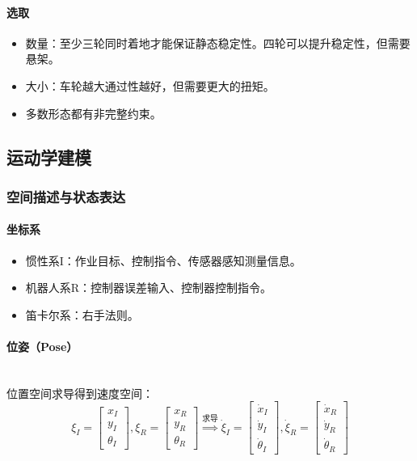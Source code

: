 \documentclass[
12pt, %
a4paper, 
oneside, %
headinclude,footinclude, %
]{scrartcl}
\begin{document}
\paragraph{选取}
\begin{itemize}
\item 数量：至少三轮同时着地才能保证静态稳定性。四轮可以提升稳定性，但需要悬架。
\item 大小：车轮越大通过性越好，但需要更大的扭矩。
\item 多数形态都有非完整约束。
\end{itemize}
\subsection[运动学建模]{运动学建模}
\subsubsection[空间描述与状态表达]{空间描述与状态表达}
\paragraph{坐标系}
\begin{itemize}
\item 惯性系I：作业目标、控制指令、传感器感知测量信息。
\item 机器人系R：控制器误差输入、控制器控制指令。
\item 笛卡尔系：右手法则。
\end{itemize}
\paragraph{位姿（Pose）}~\\

位置空间求导得到速度空间：
$$
\xi_I = \begin{bmatrix} x_I \\ y_I \\ \theta_I \end{bmatrix}, 
\xi_R = \begin{bmatrix} x_R \\ y_R \\ \theta_R \end{bmatrix}
\overset{\text{求导}}{\Longrightarrow}
\dot{\xi}_I = \begin{bmatrix} \dot{x}_I \\ \dot{y}_I \\ \dot{\theta}_I \end{bmatrix},
\dot{\xi}_R = \begin{bmatrix} \dot{x}_R \\ \dot{y}_R \\ \dot{\theta}_R \end{bmatrix}
$$
\end{document}
